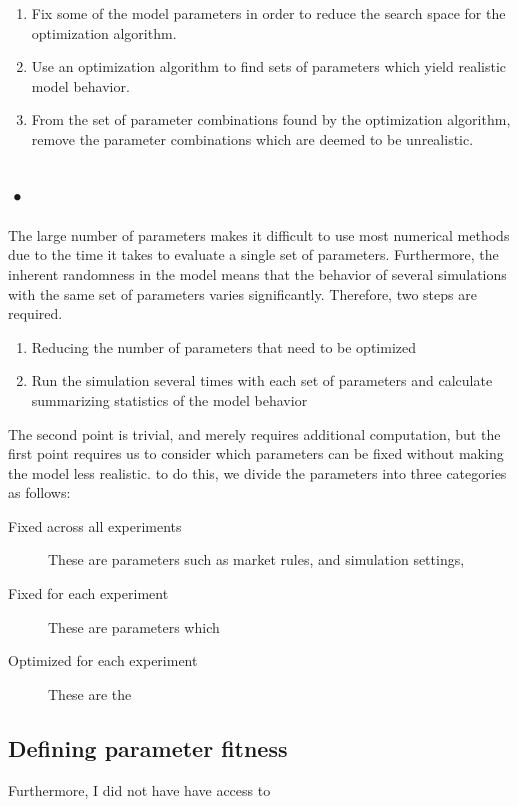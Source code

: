 \begin{enumerate}
\item Fix some of the model parameters in order to reduce the search space for the optimization algorithm.
\item Use an optimization algorithm to find sets of parameters which yield realistic model behavior.
\item From the set of parameter combinations found by the optimization algorithm, remove the parameter combinations which are deemed to be unrealistic.
\end{enumerate}

\subsection{•}
The large number of parameters makes it difficult to use most numerical methods due to the time it takes to evaluate a single set of parameters. Furthermore, the inherent randomness in the model means that the behavior of several simulations with the same set of parameters varies significantly. Therefore, two steps are required.
\begin{enumerate}
\item Reducing the number of parameters that need to be optimized
\item Run the simulation several times with each set of parameters and calculate summarizing statistics of the model behavior
\end{enumerate}
The second point is trivial, and merely requires additional computation, but the first point requires us to consider which parameters can be fixed without making the model less realistic. to do this, we divide the parameters into three categories as follows:
\begin{description}
\item[Fixed across all experiments] These are parameters such as market rules, and simulation settings, 
\item[Fixed for each experiment] These are parameters which 
\item[Optimized for each experiment] These are the 
\end{description}


\subsection{Defining parameter fitness}\label{section:simulation_fitness}
Furthermore, I did not have have access to 

